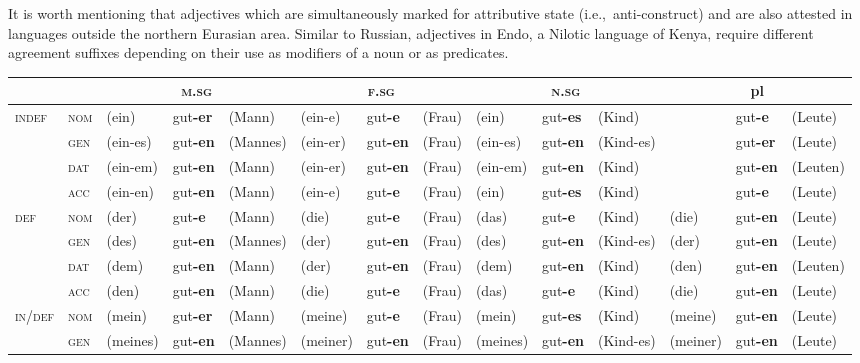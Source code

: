 It is worth mentioning that adjectives which are simultaneously marked for attributive state (i.e.,~anti\hyp{}construct) and  are also attested in languages outside the northern Eurasian area. Similar to Russian, adjectives in Endo, a Nilotic language of Kenya, require different agreement suffixes depending on their use as modifiers of a noun or as predicates.
\begin{sidewaystable}
\begin{scriptsize}
\begin{tabular}{ll lll lll lll lll}
\lsptoprule
&&\multicolumn{3}{c}{\textsc{m.sg}}&\multicolumn{3}{c}{\textsc{f.sg}}&\multicolumn{3}{c}{\textsc{n.sg}}&\multicolumn{3}{c}{pl}\\
\midrule
\multirow{4}{*}{\textsc{indef}}&\textsc{nom}&(ein)&gut\textbf{-er}&(Mann)&(ein-e)&gut\textbf{-e}&(Frau)&(ein)&gut\textbf{-es}&(Kind)&&gut\textbf{-e}&(Leute)\\
&\textsc{gen}&(ein-es)&gut\textbf{-en}&(Mannes)&(ein-er)&gut\textbf{-en}&(Frau)&(ein-es)&gut\textbf{-en}&(Kind-es)&&gut\textbf{-er}&(Leute)\\
&\textsc{dat}&(ein-em)&gut\textbf{-en}&(Mann)&(ein-er)&gut\textbf{-en}&(Frau)&(ein-em)&gut\textbf{-en}&(Kind)&&gut\textbf{-en}&(Leuten)\\
&\textsc{acc}&(ein-en)&gut\textbf{-en}&(Mann)&(ein-e)&gut\textbf{-e}&(Frau)&(ein)&gut\textbf{-es}&(Kind)&&gut\textbf{-e}&(Leute)\\
\midrule
\multirow{4}{*}{\textsc{def}}	&\textsc{nom}&(der)&gut\textbf{-e}&(Mann)&(die)&gut\textbf{-e}&(Frau)&(das)&gut\textbf{-e}&(Kind)&(die)&gut\textbf{-en}&(Leute)\\
&\textsc{gen}&(des)&gut\textbf{-en}&(Mannes)&(der)&gut\textbf{-en}&(Frau)&(des)&gut\textbf{-en}&(Kind-es)&(der)&gut\textbf{-en}&(Leute)\\
&\textsc{dat}&(dem)&gut\textbf{-en}&(Mann)&(der)&gut\textbf{-en}&(Frau)&(dem)&gut\textbf{-en}&(Kind)&(den)&gut\textbf{-en}&(Leuten)\\
&\textsc{acc}&(den)&gut\textbf{-en}&(Mann)&(die)&gut\textbf{-e}&(Frau)&(das)&gut\textbf{-e}&(Kind)&(die)&gut\textbf{-en}&(Leute)\\
\midrule
\multirow{4}{*}{\textsc{in/def}}	&\textsc{nom}&(mein)&gut\textbf{-er}&(Mann)&(meine)&gut\textbf{-e}&(Frau)&(mein)&gut\textbf{-es}&(Kind)&(meine)&gut\textbf{-en}&(Leute)\\
&\textsc{gen}&(meines)&gut\textbf{-en}&(Mannes)&(meiner)&gut\textbf{-en}&(Frau)&(meines)&gut\textbf{-en}&(Kind-es)&(meiner)&gut\textbf{-en}&(Leute)\\

\end{tabular}
\end{scriptsize}
\end{sidewaystable}
